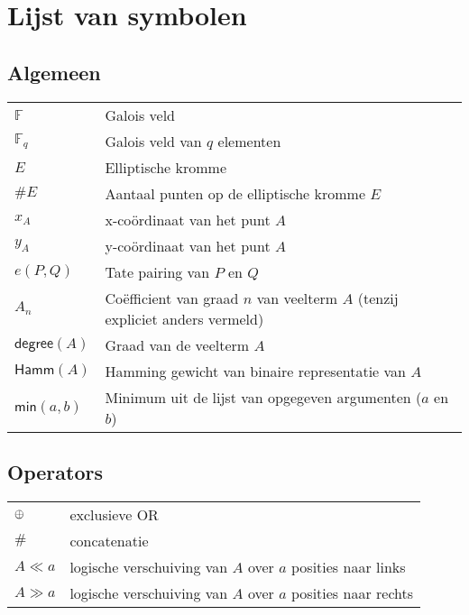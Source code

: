 \chapter*{Lijst van symbolen}

\section*{Algemeen}

\begin{tabular}{l@{$\qquad$}l}
$\mathbb{F}$	& Galois veld\\
$\mathbb{F}_q$	& Galois veld van $q$ elementen\\
$E$				& Elliptische kromme\\
$\#E$				& Aantaal punten op de elliptische kromme $E$\\
$x_A$				& x-co\"ordinaat van het punt $A$\\
$y_A$				& y-co\"ordinaat van het punt $A$\\
$e(P, Q)$		& Tate pairing van $P$ en $Q$\\
$A_n$				& Co\"efficient van graad $n$ van veelterm $A$ (tenzij expliciet anders vermeld)\\
$\textsf{degree}(A)$	& Graad van de veelterm $A$\\
$\textsf{Hamm}(A)$	& Hamming gewicht van binaire representatie van $A$\\
$\textsf{min}(a, b)$	& Minimum  uit de lijst van opgegeven argumenten ($a$ en $b$)\\
\end{tabular}

\section*{Operators}

\begin{tabular}{l@{$\qquad$}l}
$\oplus$	& exclusieve OR\\
$\#$		& concatenatie\\
$A \ll a$	& logische verschuiving van $A$ over $a$ posities naar links\\
$A \gg a$	& logische verschuiving van $A$ over $a$ posities naar rechts\\
\end{tabular}
